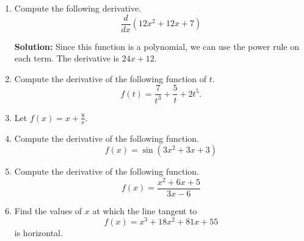 \documentclass{article}
\begin{document}
\ActivityTitle[class=Calculus I, number=3, name=Differentiation I (Solutions)]

\begin{enumerate}
\item Compute the following derivative. \[ \frac{d}{dx} \left( 12 x^2 + 12 x + 7 \right) \]

\textbf{Solution:}
Since this function is a polynomial, we can use the power rule on each term. The derivative is $24 x + 12$.

  
\vspace{1cm}

\item Compute the derivative of the following function of $t$. \[ f(t) = \frac{7}{t^{3}} + \frac{5}{t} + 2 t^{5}. \]

  
\vspace{1cm}

\item Let $f(x) = x + \frac{8}{x}$.

  
\vspace{1cm}

\item Compute the derivative of the following function. \[ f(x) = \sin(3 x^2 + 3 x + 3) \]

  
\vspace{1cm}

\item Compute the derivative of the following function. \[ f(x) = \frac{x^2 + 6 x + 5}{3 x - 6} \]

  
\vspace{1cm}

\item Find the values of $x$ at which the line tangent to \[ f(x) = x^3 + 18 x^2 + 81 x + 55 \] is horizontal.

  
\vspace{1cm}
\end{enumerate}
\end{document}
